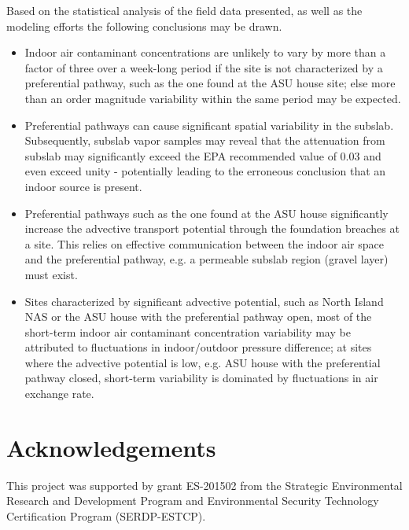 \documentclass[preprint,12pt]{elsarticle}
\begin{document}
Based on the statistical analysis of the field data presented, as well as the modeling efforts the following conclusions may be drawn.
\begin{itemize}
  \item Indoor air contaminant concentrations are unlikely to vary by more than a factor of three over a week-long period if the site is not characterized by a preferential pathway, such as the one found at the ASU house site; else more than an order magnitude variability within the same period may be expected.
  \item Preferential pathways can cause significant spatial variability in the subslab. Subsequently, subslab vapor samples may reveal that the attenuation from subslab may significantly exceed the EPA recommended value of 0.03 and even exceed unity - potentially leading to the erroneous conclusion that an indoor source is present.
  \item Preferential pathways such as the one found at the ASU house significantly increase the advective transport potential through the foundation breaches at a site. This relies on effective communication between the indoor air space and the preferential pathway, e.g. a permeable subslab region (gravel layer) must exist.
  \item Sites characterized by significant advective potential, such as North Island NAS or the ASU house with the preferential pathway open, most of the short-term indoor air contaminant concentration variability may be attributed to fluctuations in indoor/outdoor pressure difference; at sites where the advective potential is low, e.g. ASU house with the preferential pathway closed, short-term variability is dominated by fluctuations in air exchange rate.
\end{itemize}


\section*{Acknowledgements}
This project was supported by grant ES-201502 from the Strategic Environmental Research and Development Program and Environmental Security Technology Certification Program (SERDP-ESTCP).

\appendix
\end{document}
